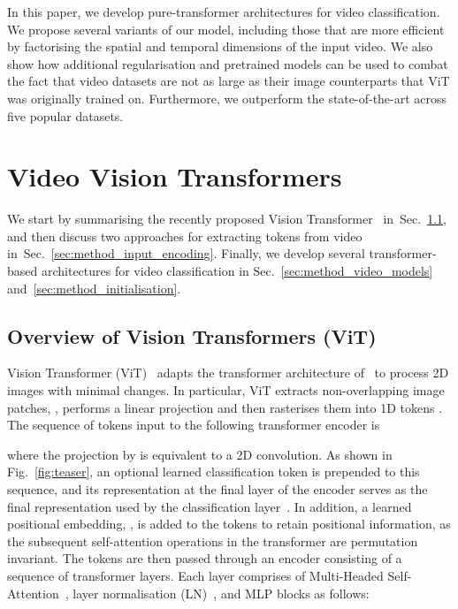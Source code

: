 \documentclass[10pt,twocolumn,letterpaper]{article}
\begin{document}
In this paper, we develop pure-transformer architectures for video classification.
We propose several variants of our model, including those that are more efficient by factorising the spatial and temporal dimensions of the input video.
We also show how additional regularisation and pretrained models can be used to combat the fact that video datasets are not as large as their image counterparts that ViT was originally trained on.
Furthermore, we outperform the state-of-the-art across five popular datasets.


 \section{Video Vision Transformers}
\label{sec:method}

We start by summarising the recently proposed Vision Transformer~\cite{dosovitskiy_iclr_2021} in~Sec.~\ref{sec:method_background}, and then discuss two approaches for extracting tokens from video in~Sec.~\ref{sec:method_input_encoding}. Finally, we develop several transformer-based architectures for video classification in Sec.~\ref{sec:method_video_models} and~\ref{sec:method_initialisation}.


\subsection{Overview of Vision Transformers (ViT)}
\label{sec:method_background}



Vision Transformer (ViT)~\cite{dosovitskiy_iclr_2021} adapts the transformer architecture of~\cite{vaswani_neurips_2017} to process 2D images with minimal changes.
In particular, ViT extracts  non-overlapping image patches, , performs a linear projection and then rasterises them into 1D tokens . The sequence of tokens input to the following transformer encoder is

where the projection by  is equivalent to a 2D convolution.
As shown in Fig.~\ref{fig:teaser}, an optional learned classification token  is prepended to this sequence, and its representation at the final layer of the encoder serves as the final representation used by the classification layer~\cite{devlin_naacl_2019}.
In addition, a learned positional embedding, , is added to the tokens to retain positional information, as the subsequent self-attention operations in the transformer are permutation invariant.
The tokens are then passed through an encoder consisting of a sequence of  transformer layers.
Each layer  comprises of Multi-Headed Self-Attention~\cite{vaswani_neurips_2017}, layer normalisation (LN)~\cite{ba_arxiv_2016}, and MLP blocks as follows:
\end{document}
